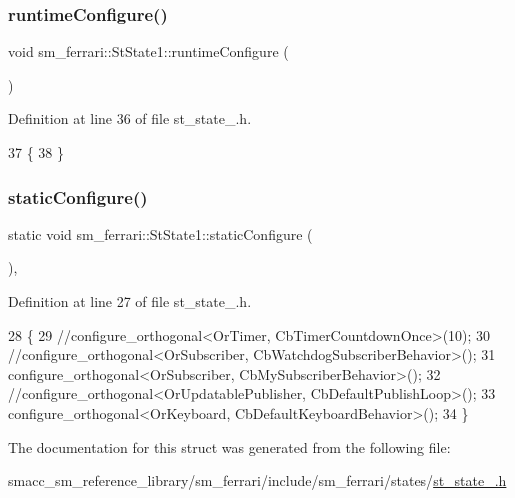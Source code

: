 \subsubsection{\texorpdfstring{runtime\+Configure()}{runtimeConfigure()}}
{\footnotesize\ttfamily void sm\+\_\+ferrari\+::\+St\+State1\+::runtime\+Configure (\begin{DoxyParamCaption}{ }\end{DoxyParamCaption})\hspace{0.3cm}{\ttfamily [inline]}}



Definition at line 36 of file st\+\_\+state\+\_.\+h.


\begin{DoxyCode}
37     \{
38     \}
\end{DoxyCode}
\mbox{\label{structsm__ferrari_1_1StState1_a9b9203b9ef7001c90e76bbc687baae43}} 
\subsubsection{\texorpdfstring{static\+Configure()}{staticConfigure()}}
{\footnotesize\ttfamily static void sm\+\_\+ferrari\+::\+St\+State1\+::static\+Configure (\begin{DoxyParamCaption}{ }\end{DoxyParamCaption})\hspace{0.3cm}{\ttfamily [inline]}, {\ttfamily [static]}}



Definition at line 27 of file st\+\_\+state\+\_.\+h.


\begin{DoxyCode}
28     \{
29         \textcolor{comment}{//configure\_orthogonal<OrTimer, CbTimerCountdownOnce>(10);   }
30         \textcolor{comment}{//configure\_orthogonal<OrSubscriber, CbWatchdogSubscriberBehavior>();}
31         configure\_orthogonal<OrSubscriber, CbMySubscriberBehavior>();
32         \textcolor{comment}{//configure\_orthogonal<OrUpdatablePublisher, CbDefaultPublishLoop>();}
33         configure\_orthogonal<OrKeyboard, CbDefaultKeyboardBehavior>();
34     \}
\end{DoxyCode}


The documentation for this struct was generated from the following file\+:\begin{DoxyCompactItemize}
\item 
smacc\+\_\+sm\+\_\+reference\+\_\+library/sm\+\_\+ferrari/include/sm\+\_\+ferrari/states/\hyperlink{sm__ferrari_2include_2sm__ferrari_2states_2st__state__1_8h}{st\+\_\+state\+\_.\+h}\end{DoxyCompactItemize}
